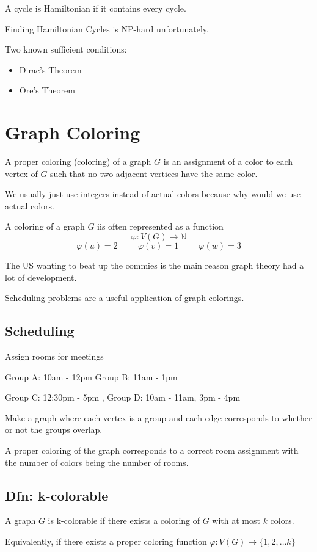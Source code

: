 \documentclass{report}
\newcommand{\hp}{\hspace{1cm}}
\begin{document}
A cycle is Hamiltonian if it contains every cycle.

Finding Hamiltonian Cycles is NP-hard unfortunately.

Two known sufficient conditions:
\begin{itemize}
\item
Dirac's Theorem
\item
Ore's Theorem
\end{itemize}


\chapter{Graph Coloring}
A proper coloring (coloring) of a graph $G$ is an assignment of a color to each vertex of $G$ such that no two adjacent vertices have the same color.

We usually just use integers instead of actual colors because why would we use actual colors.

A coloring of a graph $G$ iis often represented as a function
\[
\varphi: V(G) \rightarrow \mathbb{N}
\]
\[
\varphi(u) = 2 
\hp
\varphi(v) = 1
\hp
\varphi(w) = 3 
\]

The US wanting to beat up the commies is the main reason graph theory had a lot of development.

Scheduling problems are a useful application of graph colorings.

\section{Scheduling}
Assign rooms for meetings

Group A: 10am - 12pm
\hp
Group B: 11am - 1pm

\noindent
Group C: 12:30pm - 5pm
,
Group D: 10am - 11am, 3pm - 4pm

Make a graph where each vertex is a group and each edge corresponds to whether or not the groups overlap.

A proper coloring of the graph corresponds to a correct room assignment with the number of colors being the number of rooms.

\section{Dfn: k-colorable}
A graph $G$ is k-colorable if there exists a coloring of $G$ with at most $k$ colors.

Equivalently, if there exists a proper coloring function $\varphi: V(G) \rightarrow \{1, 2, \ldots k \}$
\end{document}
